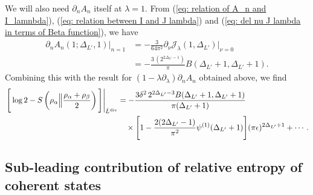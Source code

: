 \documentclass[11pt]{article}
\newcommand{\ep}{\epsilon}
\newcommand{\p}{\partial}
\newcommand{\nn}{\nonumber}
\newcommand{\lb}{\left(}
\newcommand{\rb}{\right)}
\begin{document}
We will also need $\p_nA_n$ itself at $\lambda=1$. From
(\ref{eq: relation of A_n and I_lamnbda}),
(\ref{eq: relation between I and J lambda}) and (\ref{eq: del nu J lambda in terms of Beta function}), we have
\begin{align}
    \p_nA_n(1;\Delta_{L'},1)\Big|_{n=1}
    &=
    -\frac{3}{64\pi^2}
    \p_\nu\mathcal{J}_\lambda(1,\Delta_{L'})
    \Big|_{\nu=0}
    \nn\\
    &=
    -\frac{
    3\,\lb 2^{2\Delta_{L'}-1}\rb
    }{\pi}
    B(\Delta_{L'}+1,\Delta_{L'}+1).
\end{align}
Combining this with the result for
$\lb1-\lambda\p_\lambda\rb\p_nA_n$ obtained above, we find
\begin{align}
    \left.
    \Bigg[
    \log2-
    S\lb
    \rho_\alpha
    \Big\|
    \frac{\rho_\alpha+\rho_\beta}{2}
    \rb
    \Bigg]
    \right|_{\hat L^{\rm div}}
    &=
    -\frac{
    3\delta^2\,2^{2\Delta_{L'}-3}
    B(\Delta_{L'}+1,\Delta_{L'}+1)
    }{
    \pi(\Delta_{L'}+1)
    }
    \nn\\
    &\quad\times
    \Bigg[
    1-
    \frac{2(2\Delta_{L'}-1)}{\pi^2}
    \psi^{(1)}(\Delta_{L'}+1)
    \Bigg]
    (\pi\ep)^{2\Delta_{L'}+1}
    +\cdots .
\end{align}
\subsection{Sub-leading contribution of relative entropy of coherent states}
\end{document}
